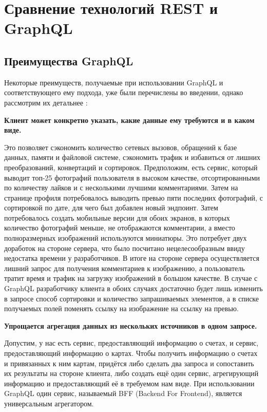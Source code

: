 \section{Сравнение технологий REST и GraphQL}\label{sec:rest-vs-graphql}

\subsection{Преимущества GraphQL}\label{subsec:graphql-advantages}

Некоторые преимуществ, получаемые при использовании GraphQL и соответствующего ему подхода, уже были перечислены во введении, однако рассмотрим их детальнее\cite{graphql-why-use} \cite{rest-soap-graphql-guide}:

\textbf{Клиент может конкретно указать, какие данные ему требуются и в каком виде.}

Это позволяет сэкономить количество сетевых вызовов, обращений к базе данных, памяти и файловой системе, сэкономить трафик и избавиться от лишних преобразований, конвертаций и сортировок.
Предположим, есть сервис, который выводит топ-25 фотографий пользователя в высоком качестве, отсортированными по количеству лайков и с несколькими лучшими комментариями.
Затем на странице профиля потребовалось выводить превью пяти последних фотографий, с сортировкой по дате, для чего был добавлен новый эндпоинт.
Затем потребовалось создать мобильные версии для обоих экранов, в которых количество фотографий меньше, не отображаются комментарии, а вместо полноразмерных изображений используются миниатюры.
Это потребует двух доработок на стороне сервера, что было посчитано нецелесообразным ввиду недостатка времени у разработчиков.
В итоге на стороне сервера осуществляется лишний запрос для получения комментариев к изображению, а пользователь тратит время и трафик на загрузку изображений в большом качестве.
В случае с GraphQL разработчику клиента в обоих случаях достаточно будет лишь изменить в запросе способ сортировки и количество запрашиваемых элементов, а в списке получаемых полей поменять ссылку на изображение на ссылку на превью.

\textbf{Упрощается агрегация данных из нескольких источников в одном запросе.}

Допустим, у нас есть сервис, предоставляющий информацию о счетах, и сервис, предоставляющий информацию о картах.
Чтобы получить информацию о счетах и привязанных к ним картам, придётся либо сделать два запроса и сопоставить их результаты на стороне клиента, либо создать ещё один сервис, агрегирующий информацию и предоставляющий её в требуемом нам виде.
При использовании GraphQL один сервис, называемый BFF (Backend For Frontend), является универсальным агрегатором.

